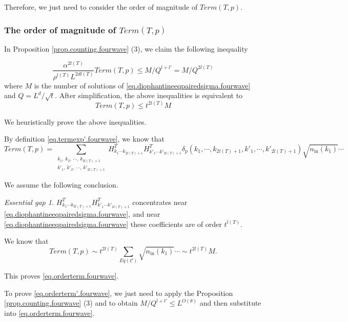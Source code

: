 Therefore, we just need to consider the order of magnitude of $Term(T,p)$.

\subsubsection{The order of magnitude of $Term(T,p)$}

In Proposition \ref{prop.counting.fourwave} (3), we claim the following inequality

\begin{equation}\label{eq.orderterm.fourwave}
 \frac{\alpha^{2l(T)}}{\rho^{l(T)}L^{2dl(T)}}Term(T,p)\le M/Q^{l+l'} = M/Q^{2l(T)}
\end{equation}
where $M$ is the number of solutions of \eqref{eq.diophantineeqpairedsigma.fourwave} and $Q=L^d/\sqrt{t}$. After simplification, the above inequalities is equivalent to 
\begin{equation}
 Term(T, p) \le t^{2l(T)} M
\end{equation}

We heuristically prove the above inequalities. 

By definition \eqref{eq.termexp'.fourwave}, we know that 
\begin{equation}
 Term(T, p) = \sum_{\substack{k_1,\, k_2,\, \cdots,\, k_{2l(T)+1}\\k'_1,\, k'_2,\, \cdots,\, k'_{2l(T)+1}}}
 H^T_{k_1\cdots k_{2l(T)+1}} H^{T}_{k'_1\cdots k'_{2l(T)+1}} \delta_{p}(k_1,\cdots, k_{2l(T)+1}, k'_1,\cdots, k'_{2l(T)+1})\sqrt{n_{\textrm{in}}(k_1)}\cdots
\end{equation}

We assume the following conclusion.

\textit{Essential gap 1.} $H^T_{k_1\cdots k_{2l(T)+1}} H^{T}_{k'_1\cdots k'_{2l(T)+1}} $ concentrates near \eqref{eq.diophantineeqpairedsigma.fourwave}, and near \eqref{eq.diophantineeqpairedsigma.fourwave} these coefficients are of order $t^{l(T)}$.

We know that 
\begin{equation}
 Term(T, p) \sim t^{2l(T)}\sum_{Eq(\mathcal{C})}
 \sqrt{n_{\textrm{in}}(k_1)}\cdots \sim t^{2l(T)} M. 
\end{equation}

This proves \eqref{eq.orderterm.fourwave}.

To prove \eqref{eq.orderterm'.fourwave}, we just need to apply the Proposition \ref{prop.counting.fourwave} (3) and to obtain $M/Q^{l+l'}\leq L^{O(\theta)}$ and then substitute into \eqref{eq.orderterm.fourwave}.

